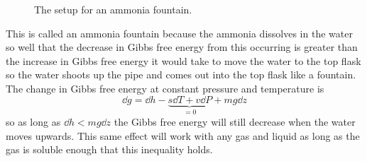     \begin{figure}[ht]
        \centering
        \caption{The setup for an ammonia fountain.}
        \label{fig:ammonia fountain}
    \end{figure}
    This is called an ammonia fountain because the ammonia dissolves in the water so well that the decrease in Gibbs free energy from this occurring is greater than the increase in Gibbs free energy it would take to move the water to the top flask so the water shoots up the pipe and comes out into the top flask like a fountain.
    The change in Gibbs free energy at constant pressure and temperature is
    \[\dd{g} = \dd{h} - \underbrace{s\dd{T} + v\dd{P}}_{=0} + mg\dd{z}\]
    so as long as \(\dd{h} < mg\dd{z}\) the Gibbs free energy will still decrease when the water moves upwards.
    This same effect will work with any gas and liquid as long as the gas is soluble enough that this inequality holds.
    
